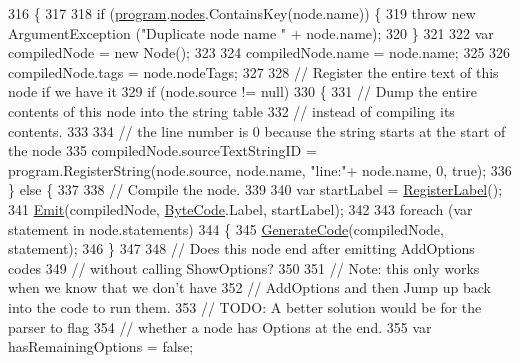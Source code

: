 \begin{DoxyCode}
316                                                     \{
317 
318             \textcolor{keywordflow}{if} (\hyperlink{a00034_aa1737da428ec7d597009661dd8a47829}{program}.\hyperlink{a00126_a3f4928a577c88263ad016be259b175c4}{nodes}.ContainsKey(node.name)) \{
319                 \textcolor{keywordflow}{throw} \textcolor{keyword}{new} ArgumentException (\textcolor{stringliteral}{"Duplicate node name "} + node.name);
320             \}
321 
322             var compiledNode =  \textcolor{keyword}{new} Node();
323 
324             compiledNode.name = node.name;
325 
326             compiledNode.tags = node.nodeTags;
327 
328             \textcolor{comment}{// Register the entire text of this node if we have it}
329             \textcolor{keywordflow}{if} (node.source != null)
330             \{
331                 \textcolor{comment}{// Dump the entire contents of this node into the string table }
332                 \textcolor{comment}{// instead of compiling its contents.}
333 
334                 \textcolor{comment}{// the line number is 0 because the string starts at the start of the node}
335                 compiledNode.sourceTextStringID = program.RegisterString(node.source, node.name, \textcolor{stringliteral}{"line:"}+
      node.name, 0, \textcolor{keyword}{true});
336             \} \textcolor{keywordflow}{else} \{
337 
338                 \textcolor{comment}{// Compile the node.}
339 
340                 var startLabel = \hyperlink{a00034_a1bae0d8b701a59708641aa36ea971fa5}{RegisterLabel}();
341                 \hyperlink{a00034_a774e8c143cdda0584fcfdda98626a83c}{Emit}(compiledNode, \hyperlink{a00031_ad5dfb6ee68ca7469623ad3e459f98894}{ByteCode}.Label, startLabel);
342 
343                 \textcolor{keywordflow}{foreach} (var statement \textcolor{keywordflow}{in} node.statements)
344                 \{
345                     \hyperlink{a00034_a006f3becd521cc179ba3d3352f6f930b}{GenerateCode}(compiledNode, statement);
346                 \}
347 
348                 \textcolor{comment}{// Does this node end after emitting AddOptions codes}
349                 \textcolor{comment}{// without calling ShowOptions?}
350 
351                 \textcolor{comment}{// Note: this only works when we know that we don't have}
352                 \textcolor{comment}{// AddOptions and then Jump up back into the code to run them.}
353                 \textcolor{comment}{// TODO: A better solution would be for the parser to flag}
354                 \textcolor{comment}{// whether a node has Options at the end.}
355                 var hasRemainingOptions = \textcolor{keyword}{false};

\end{DoxyCode}
